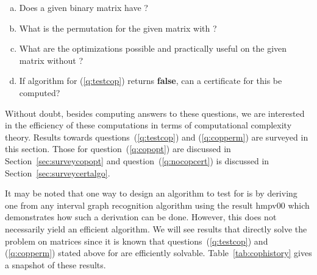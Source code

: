 \begin{enumerate}[a.]
\singlespacing
\item \label{q:testcop} Does a given binary matrix have \COP?
\item \label{q:copperm} What is the \COP permutation for the given matrix with \COP?
\item \label{q:copopt} What are the optimizations possible and practically useful on
  the given matrix without \COP?
\item \label{q:nocopcert} If algorithm for (\ref{q:testcop}) returns
  \textbf{false}, can a certificate for this be computed?
\end{enumerate}

Without doubt, besides computing answers to these questions, we are
interested in the efficiency of these computations in terms of
computational complexity theory. Results towards
questions~(\ref{q:testcop}) and (\ref{q:copperm}) are surveyed in this
section. Those for question~(\ref{q:copopt}) are discussed in
Section~\ref{sec:surveycopopt} and question~(\ref{q:nocopcert}) is discussed
in Section~\ref{sec:surveycertalgo}.

It may be noted that one way to design an algorithm to test for \COP
is by deriving one from any interval graph recognition algorithm using the
result {\sc hmpv00}  \cite{d08phd} which demonstrates how such a derivation can be
done. However, this does not necessarily yield an efficient
algorithm. We will see results that directly solve the problem on
matrices since it is known that questions~(\ref{q:testcop}) and
(\ref{q:copperm}) stated above for \COP are efficiently solvable.
Table~\ref{tab:cophistory} gives a snapshot of these results.


